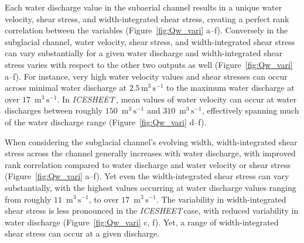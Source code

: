 \documentclass[draft]{agujournal2019}
\newcommand{\icesheet}{\textit{ICESHEET}\,}
\newcommand{\unit}[1]{$\mathrm{#1}$}
\begin{document}
Each water discharge value in the subaerial channel results in a unique water velocity, shear stress, and width-integrated shear stress, creating a perfect rank correlation between the variables (Figure~\ref{fig:Qw_vari} a--f).
Conversely in the subglacial channel,  water velocity, shear stress, and width-integrated shear stress can vary substantially for a given water discharge and width-integrated shear stress varies with respect to the other two  outputs as well (Figure~\ref{fig:Qw_vari} a--f).
For instance, very high  water velocity values and shear stresses can occur across minimal water discharge at $2.5$\,\unit{m}$^3$\,\unit{s}$^{-1}$ to the maximum water discharge at over $17$ \,\unit{m}$^3$\,\unit{s}$^{-1}$.
In \icesheet, mean values of water velocity can occur at water discharges between roughly $150$ \,\unit{m}$^3$\,\unit{s}$^{-1}$ and $310$ \,\unit{m}$^3$\,\unit{s}$^{-1}$, effectively spanning much of the water discharge range (Figure~\ref{fig:Qw_vari} d--f).

When considering the subglacial channel's evolving width, width-integrated shear stress  across the channel generally increases with water discharge, with improved rank correlation compared to water discharge and water velocity or shear stress (Figure~\ref{fig:Qw_vari} a--f).
Yet even the width-integrated shear stress  can vary substantially, with the highest values occurring at water discharge values ranging from roughly $11$ \,\unit{m}$^3$\,\unit{s}$^{-1}$, to over $17$ \,\unit{m}$^3$\,\unit{s}$^{-1}$.
The variability in width-integrated shear stress is less pronounced in the \icesheet case, with reduced variability in water discharge (Figure~\ref{fig:Qw_vari} c, f).
Yet, a range of width-integrated shear stress can occur at a given discharge.
\end{document}
